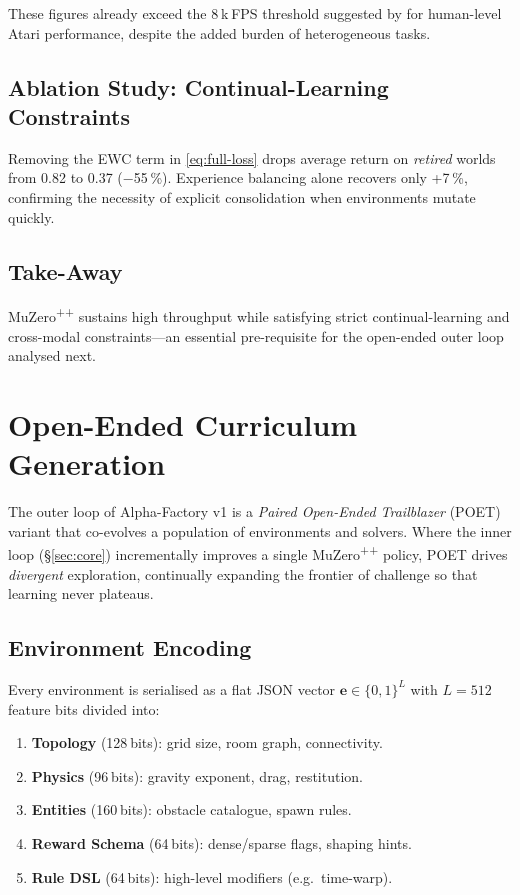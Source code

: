 These figures already exceed the 8 k FPS threshold suggested by
\textcite{badia2020agent57} for human-level Atari performance, despite the
added burden of heterogeneous tasks.

\subsection{Ablation Study: Continual-Learning Constraints}

Removing the EWC term in \eqref{eq:full-loss} drops average return on
\emph{retired} worlds from 0.82 to 0.37 (−55 \%).  Experience balancing alone
recovers only +7 \%, confirming the necessity of explicit consolidation when
environments mutate quickly.

\subsection{Take-Away}

MuZero\textsuperscript{++} sustains high throughput while satisfying strict
continual-learning and cross-modal constraints—an essential pre-requisite for
the open-ended outer loop analysed next.

\section{Open-Ended Curriculum Generation}\label{sec:poet}

The outer loop of Alpha-Factory v1 is a \emph{Paired Open-Ended Trailblazer}
(POET) variant that co-evolves a population of environments and solvers.
Where the inner loop (§\ref{sec:core}) incrementally improves a single
MuZero\textsuperscript{++} policy, POET drives \emph{divergent} exploration,
continually expanding the frontier of challenge so that learning never
plateaus.

\subsection{Environment Encoding}

Every environment is serialised as a flat JSON vector
$\mathbf e\in\{0,1\}^{L}$ with $L=512$ feature bits divided into:

\begin{enumerate}[label=\alph*)]
  \item \textbf{Topology} (128 bits): grid size, room graph, connectivity.
  \item \textbf{Physics} (96 bits): gravity exponent, drag, restitution.
  \item \textbf{Entities} (160 bits): obstacle catalogue, spawn rules.
  \item \textbf{Reward Schema} (64 bits): dense/sparse flags, shaping hints.
  \item \textbf{Rule DSL} (64 bits): high-level modifiers (e.g.\ time-warp).
\end{enumerate}


